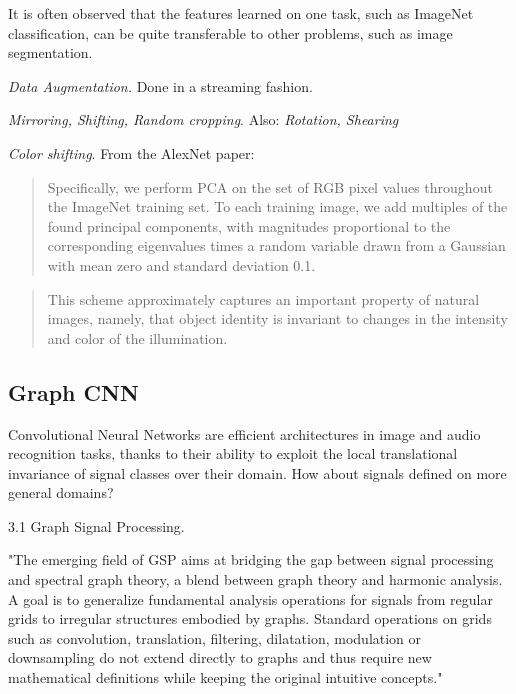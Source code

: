 \documentclass[english]{article}
\begin{document}
It is often observed that the features learned on one task, such as ImageNet classification, can be quite transferable to other problems, such as image segmentation. 

\item \emph{Data Augmentation.} Done in a streaming fashion. 

\emph{Mirroring, Shifting, Random cropping}. Also: \emph{Rotation, Shearing}

\emph{Color shifting}. From the AlexNet paper: 


\begin{quote}
Specifically, we perform PCA on the set of RGB pixel values throughout the
ImageNet training set. To each training image, we add multiples of the found principal components,
with magnitudes proportional to the corresponding eigenvalues times a random variable drawn from
a Gaussian with mean zero and standard deviation 0.1.
\end{quote}


\begin{quote}
This scheme approximately captures an important property of natural images,
namely, that object identity is invariant to changes in the intensity and color of the illumination.
\end{quote}
\eenum



\subsection{Graph CNN}
%
\bitem
\item Convolutional Neural Networks are efficient architectures in image and
audio recognition tasks, thanks to their ability to exploit the local translational
invariance of signal classes over their domain. How about signals defined on more general domains?

\item 3.1 Graph Signal Processing.


"The emerging field of GSP aims at bridging the gap between signal processing and spectral graph theory, a blend between graph theory and harmonic analysis. A goal is to generalize
fundamental analysis operations for signals from regular grids to irregular structures embodied by
graphs. Standard operations on grids
such as convolution, translation, filtering, dilatation, modulation or downsampling do not extend
directly to graphs and thus require new mathematical definitions while keeping the original intuitive
concepts."
\end{document}
